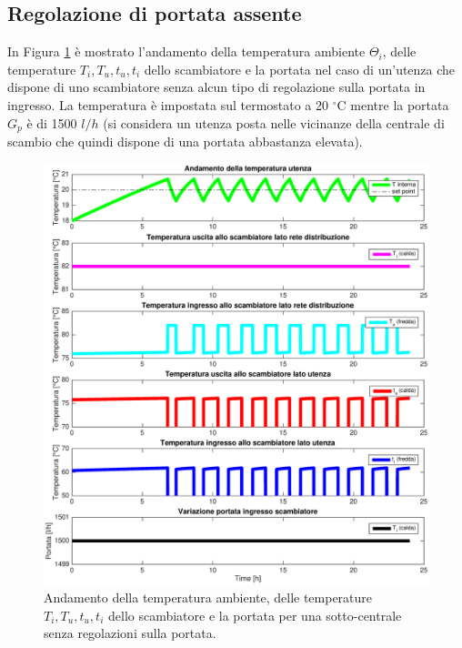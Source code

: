 \documentclass[laurea,oneside,11pt]{USiena_tesiLM}
\begin{document}
\subsection{Regolazione di portata assente}
In Figura \ref{fig:no_reg} è mostrato l'andamento della temperatura ambiente $\Theta_i$, delle temperature $T_i, T_u, t_u, t_i$ dello scambiatore e la portata nel caso di un'utenza che dispone di uno scambiatore senza alcun tipo di regolazione sulla portata in ingresso. La temperatura è impostata sul termostato a 20 $^{\circ}$C mentre la portata $G_p$ è di 1500 $l/h$ (si considera un utenza posta nelle vicinanze della centrale di scambio che quindi dispone di una portata abbastanza elevata). 

\begin{figure}[!ht]
\centering
\includegraphics[width=\textwidth]{figure/no_reg} 
\caption{Andamento della temperatura ambiente, delle temperature $T_i, T_u, t_u, t_i$  dello scambiatore e la portata per una sotto-centrale senza regolazioni sulla portata.}
\label{fig:no_reg}
\end{figure}
\end{document}
